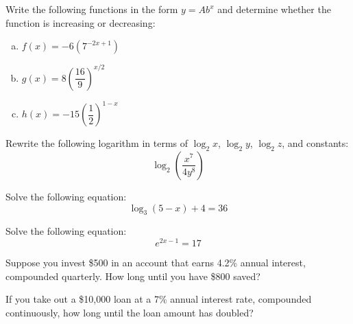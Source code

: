 \documentclass[11pt,letterpaper]{article}
\begin{document}

 Write the following functions in the form $y= Ab^x$ and determine whether the function is increasing or decreasing:
	\begin{enumerate}[(a)]
	\item $f(x)= -6(7^{-2x + 1})$
	\item $g(x)= 8 \left( \dfrac{16}{9} \right)^{x/2}$
	\item $h(x)= -15 \left( \dfrac{1}{2} \right)^{1 - x}$
	\end{enumerate}



\newpage



 Rewrite the following logarithm in terms of $\log_2 x$, $\log_2 y$, $\log_2 z$, and constants:
	\[
	\log_2 \left( \dfrac{x^7}{4y^8} \right)
	\]



\newpage



 Solve the following equation:
	\[
	\log_3(5 - x) + 4= 36
	\]



\newpage



 Solve the following equation: 
	\[
	e^{2x - 1}= 17
	\]



\newpage



 Suppose you invest \$500 in an account that earns 4.2\% annual interest, compounded quarterly. How long until you have \$800 saved?



\newpage



 If you take out a \$10,000 loan at a 7\% annual interest rate, compounded continuously, how long until the loan amount has doubled?
\end{document}
